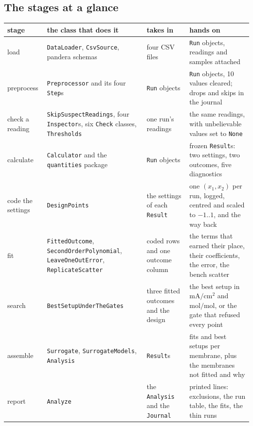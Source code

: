 \subsection{The stages at a glance}

\begin{center}
\footnotesize
\begin{tabular}{@{}>{\raggedright\arraybackslash}p{2.1cm}>{\raggedright\arraybackslash}p{3.7cm}>{\raggedright\arraybackslash}p{3.2cm}>{\raggedright\arraybackslash}p{5.0cm}@{}}
\toprule
stage & the class that does it & takes in & hands on \\
\midrule
load &
  \texttt{DataLoader}, \texttt{CsvSource}, pandera schemas &
  four CSV files &
  21 \texttt{Run} objects, readings and samples attached \\
\addlinespace
preprocess &
  \texttt{Preprocessor} and its four \texttt{Step}s &
  21 \texttt{Run} objects &
  9 \texttt{Run} objects, 10 values cleared; drops and skips in the journal \\
\addlinespace
check a reading &
  \texttt{SkipSuspectReadings}, four \texttt{Inspector}s, six \texttt{Check} classes,
  \texttt{Thresholds} &
  one run's readings &
  the same readings, with unbelievable values set to \texttt{None} \\
\addlinespace
calculate &
  \texttt{Calculator} and the \texttt{quantities} package &
  9 \texttt{Run} objects &
  9 frozen \texttt{Result}s: two settings, two outcomes, five diagnostics \\
\addlinespace
code the settings &
  \texttt{DesignPoints} &
  the settings of each \texttt{Result} &
  one $(x_1, x_2)$ per run, logged, centred and scaled to $-1..1$, and the way back \\
\addlinespace
fit &
  \texttt{FittedOutcome}, \texttt{SecondOrderPolynomial}, \texttt{LeaveOneOutError},
  \texttt{ReplicateScatter} &
  coded rows and one outcome column &
  the terms that earned their place, their coefficients, the error, the bench scatter \\
\addlinespace
search &
  \texttt{BestSetupUnderTheGates} &
  three fitted outcomes and the design &
  the best setup in $\mathrm{mA/cm^2}$ and $\mathrm{mol/mol}$, or the gate that refused
  every point \\
\addlinespace
assemble &
  \texttt{Surrogate}, \texttt{SurrogateModels}, \texttt{Analysis} &
  9 \texttt{Result}s &
  fits and best setups per membrane, plus the membranes not fitted and why \\
\addlinespace
report &
  \texttt{Analyze} &
  the \texttt{Analysis} and the \texttt{Journal} &
  printed lines: exclusions, the run table, the fits, the thin runs \\
\bottomrule
\end{tabular}
\end{center}
